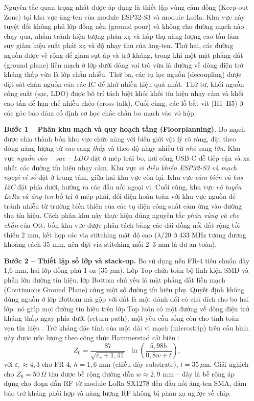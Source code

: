 Nguyên tắc quan trọng nhất được áp dụng là thiết lập vùng cấm đồng (Keep-out Zone) tại khu vực ăng-ten của module ESP32-S3 và module LoRa. Khu vực này tuyệt đối không phủ lớp đồng nền (ground pour) và không cho đường mạch nào chạy qua, nhằm tránh hiện tượng phản xạ và hấp thụ năng lượng cao tần làm suy giảm hiệu suất phát xạ và độ nhạy thu của ăng-ten. Thứ hai, các đường nguồn được vẽ rộng để giảm sụt áp và trở kháng, trong khi một mặt phẳng đất (ground plane) liền mạch ở lớp dưới đóng vai trò vừa là đường về dòng điện trở kháng thấp vừa là lớp chắn nhiễu. Thứ ba, các tụ lọc nguồn (decoupling) được đặt sát chân nguồn của các IC để khử nhiễu hiệu quả nhất. Thứ tư, khối nguồn công suất (sạc, LDO) được bố trí tách biệt khỏi khối tín hiệu nhạy cảm và khối cao tần để hạn chế nhiễu chéo (cross-talk). Cuối cùng, các lỗ bắt vít (H1--H5) ở các góc bảo đảm cố định cơ học chắc chắn bo mạch vào vỏ hộp. 

\textbf{Bước 1 -- Phân khu mạch và quy hoạch tầng (Floorplanning).} Bo mạch được chia thành bốn khu vực chức năng với biên giới vật lý rõ ràng, đặt theo dòng năng lượng từ \emph{cao} sang \emph{thấp} và theo độ nhạy nhiễu từ \emph{nhỏ} sang \emph{lớn}. Khu vực \emph{nguồn vào -- sạc -- LDO} đặt ở mép trái bo, nơi cổng USB-C dễ tiếp cận và xa nhất các đường tín hiệu nhạy cảm. Khu vực \emph{vi điều khiển ESP32-S3 và mạch ngoại vi số} đặt ở trung tâm, giữa hai khu vực còn lại. Khu vực \emph{cảm biến và bus I2C} đặt phía dưới, hướng ra các đầu nối ngoại vi. Cuối cùng, khu vực \emph{vô tuyến LoRa và ăng-ten} bố trí ở mép phải, đối diện hoàn toàn với khu vực nguồn để tránh nhiễu từ trường biến thiên của các tụ điện công suất cảm ứng vào đường thu tín hiệu. Cách phân khu này thực hiện đúng nguyên tắc \emph{phân vùng và che chắn} của Ott: bốn khu vực được phân tách bằng các dải đồng nối đất rộng tối thiểu 2 mm, kết hợp các via stitching mật độ cao ($\lambda/20$ ở 433 MHz tương đương khoảng cách 35 mm, nên đặt via stitching mỗi 2--3 mm là dư an toàn).

\textbf{Bước 2 -- Thiết lập số lớp và stack-up.} Bo sử dụng nền FR-4 tiêu chuẩn dày 1{,}6 mm, hai lớp đồng phủ 1 oz (35 $\mu$m). Lớp Top chứa toàn bộ linh kiện SMD và phần lớn đường tín hiệu, lớp Bottom chủ yếu là mặt phẳng đất liền mạch (Continuous Ground Plane) cùng một số đường tín hiệu phụ. Quyết định không dùng nguồn ở lớp Bottom mà gộp với đất là một đánh đổi có chủ đích cho bo hai lớp: nó giúp mọi đường tín hiệu trên lớp Top luôn có một đường về dòng điện trở kháng thấp ngay phía dưới (return path), một yêu cầu sống còn cho tính toàn vẹn tín hiệu \cite{johnson1993high}. Trở kháng đặc tính của một dải vi mạch (microstrip) trên cấu hình này được ước lượng theo công thức Hammerstad cải biên \cite{hammerstad1975}:
\begin{equation}
    Z_0 = \frac{87}{\sqrt{\varepsilon_r+1{,}41}}\cdot \ln\!\left(\frac{5{,}98h}{0{,}8w + t}\right),
\end{equation}
với $\varepsilon_r \approx 4{,}3$ cho FR-4, $h=1{,}6$ mm (chiều dày substrate), $t=35\,\mu$m. Giải nghịch cho $Z_0=50\,\Omega$ thu được bề rộng đường dẫn $w \approx 2{,}9$ mm -- đây là bề rộng áp dụng cho đoạn dẫn RF từ module LoRa SX1278 đến đầu nối ăng-ten SMA, đảm bảo trở kháng phối hợp và năng lượng RF không bị phản xạ ngược về chip.

